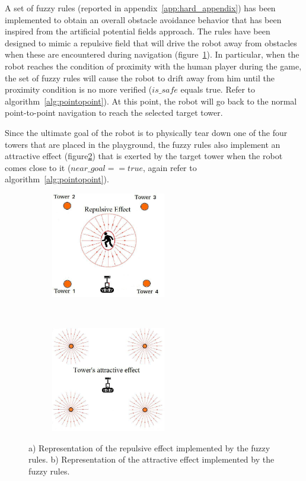 A set of fuzzy rules (reported in appendix~\ref{app:hard_appendix})	has been implemented to obtain an overall obstacle avoidance behavior that has been inspired from the artificial potential fields approach. The rules have been designed to mimic a repulsive field that will drive the robot away from obstacles when these are encountered during navigation (figure~\ref{avoid1}). In particular, when the robot reaches the condition of proximity with the human player during the game, the set of fuzzy rules will cause the robot to drift away from him until the proximity condition is no more verified ($is\_safe$ equals true. Refer to algorithm~\ref{alg:pointopoint}). At this point, the robot will go back to the normal point-to-point navigation to reach the selected target tower.

Since the ultimate goal of the robot is to physically tear down one of the four towers that are placed in the playground, the fuzzy rules also implement an attractive effect (figure\ref{avoid2}) that is exerted by the target tower when the robot comes close to it  ($near\_goal == true$, again refer to algorithm~\ref{alg:pointopoint}). %

\begin{figure}[H]
	\centering
	\begin{subfigure}[b]{0.4\textwidth}
		\includegraphics[width=5cm]{images/03-foundation/avoid1}
		\caption{}
		\label{avoid1} 
	\end{subfigure}
    ~
	\begin{subfigure}[b]{0.4\textwidth}
		\includegraphics[width=5cm]{images/03-foundation/avoid2}
		\caption{}
		\label{avoid2}
	\end{subfigure}
	\caption{a) Representation of the repulsive effect implemented by the fuzzy rules. b) Representation of the attractive effect implemented by the fuzzy rules. }
	\label{rulesbehavior}
\end{figure}

